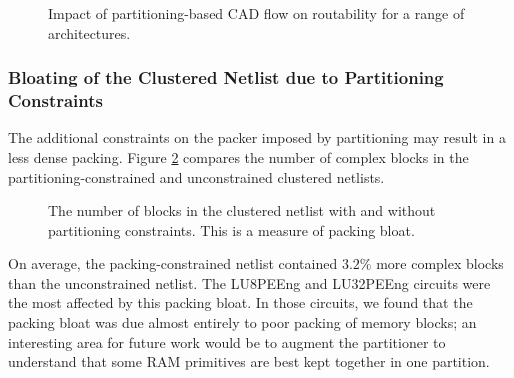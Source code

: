 \begin{figure}[!htbp]
\centering

\caption{Impact of partitioning-based CAD flow on routability for a range of architectures.}
\label{fig:wires_cut}
\end{figure}

\subsubsection{Bloating of the Clustered Netlist due to Partitioning Constraints}
The additional constraints on the packer imposed by partitioning may result in a less dense packing. Figure \ref{fig:packing_bloat} compares the number of complex blocks in the partitioning-constrained and unconstrained clustered netlists.

\begin{figure}[!htbp]
\centering

\caption{The number of blocks in the clustered netlist with and without partitioning constraints. This is a measure of packing bloat.}
\label{fig:packing_bloat}
\end{figure}

On average, the packing-constrained netlist contained $3.2\%$ more complex blocks than the unconstrained netlist. The LU8PEEng and LU32PEEng circuits were the most affected by this packing bloat. In those circuits, we found that the packing bloat was due almost entirely to poor packing of memory blocks; an interesting area for future work would be to augment the partitioner to understand that some RAM primitives are best kept together in one partition.
